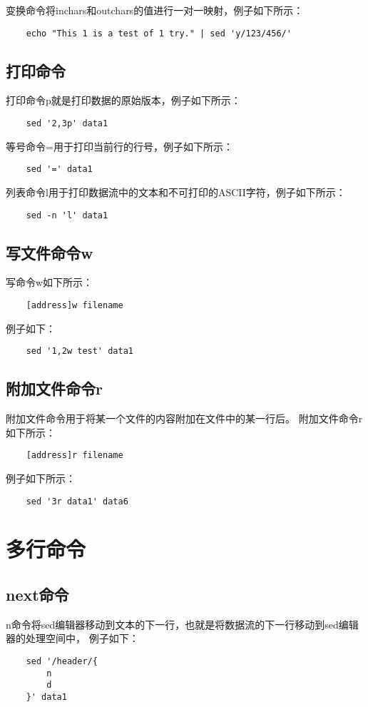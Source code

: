 \documentclass[a4paper,left=2.5cm,right=2.5cm,11pt]{article}
\begin{document}
	变换命令将inchars和outchars的值进行一对一映射，例子如下所示：
	\begin{lstlisting}
	echo "This 1 is a test of 1 try." | sed 'y/123/456/'
	\end{lstlisting}

\subsection{打印命令}
	打印命令p就是打印数据的原始版本，例子如下所示：
	\begin{lstlisting}
	sed '2,3p' data1
	\end{lstlisting}

	等号命令=用于打印当前行的行号，例子如下所示：
	\begin{lstlisting}
	sed '=' data1
	\end{lstlisting}

	列表命令l用于打印数据流中的文本和不可打印的ASCII字符，例子如下所示：
	\begin{lstlisting}
	sed -n 'l' data1
	\end{lstlisting}

\subsection{写文件命令w}
	写命令w如下所示：
	\begin{lstlisting}
	[address]w filename
	\end{lstlisting}

	例子如下：
	\begin{lstlisting}
	sed '1,2w test' data1
	\end{lstlisting}

\subsection{附加文件命令r}
	附加文件命令用于将某一个文件的内容附加在文件中的某一行后。
	附加文件命令r如下所示：
	\begin{lstlisting}
	[address]r filename
	\end{lstlisting}

	例子如下所示：
	\begin{lstlisting}
	sed '3r data1' data6
	\end{lstlisting}

\section{多行命令}
\subsection{next命令}
	n命令将sed编辑器移动到文本的下一行，也就是将数据流的下一行移动到sed编辑器的处理空间中，
	例子如下：
	\begin{lstlisting}
	sed '/header/{
		n
		d
	}' data1
	\end{lstlisting}
\end{document}
